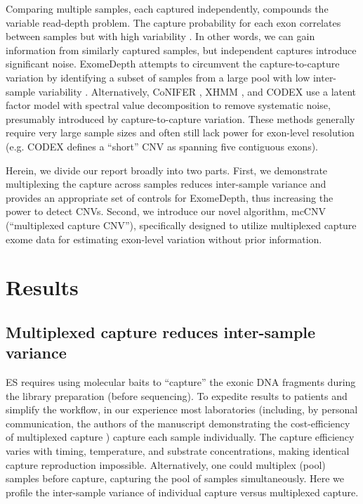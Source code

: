 \documentclass{bmcart}\usepackage[]{graphicx}\usepackage[]{color}
\begin{document}
Comparing multiple samples, each captured independently, compounds the variable read-depth problem.
The capture probability for each exon correlates between samples but with high variability \cite{plagnol:2012aa}.
In other words, we can gain information from similarly captured samples, but independent captures introduce significant noise.
ExomeDepth attempts to circumvent the capture-to-capture variation by identifying a subset of samples from a large pool with low inter-sample variability \cite{plagnol:2012aa}.
Alternatively, CoNIFER \cite{krumm:2012aa}, XHMM \cite{fromer:2012aa}, and CODEX \cite{jiang:2015aa} use a latent factor model with spectral value decomposition to remove systematic noise, presumably introduced by capture-to-capture variation.
These methods generally require very large sample sizes and often still lack power for exon-level resolution (e.g. CODEX defines a ``short'' CNV as spanning five contiguous exons).

Herein, we divide our report broadly into two parts.
First, we demonstrate multiplexing the capture across samples reduces inter-sample variance and provides an appropriate set of controls for ExomeDepth, thus increasing the power to detect CNVs.
Second, we introduce our novel algorithm, mcCNV (``multiplexed capture CNV''), specifically designed to utilize multiplexed capture exome data for estimating exon-level variation without prior information.


\section{Results}

\subsection{Multiplexed capture reduces inter-sample variance}

ES requires using molecular baits to ``capture'' the exonic DNA fragments during the library preparation (before sequencing).
To expedite results to patients and simplify the workflow, in our experience most laboratories (including, by personal communication, the authors of the manuscript demonstrating the cost-efficiency of multiplexed capture \cite{shearer:2012aa}) capture each sample individually.
The capture efficiency varies with timing, temperature, and substrate concentrations, making identical capture reproduction impossible.
Alternatively, one could multiplex (pool) samples before capture, capturing the pool of samples simultaneously.
Here we profile the inter-sample variance of individual capture versus multiplexed capture.
\end{document}
